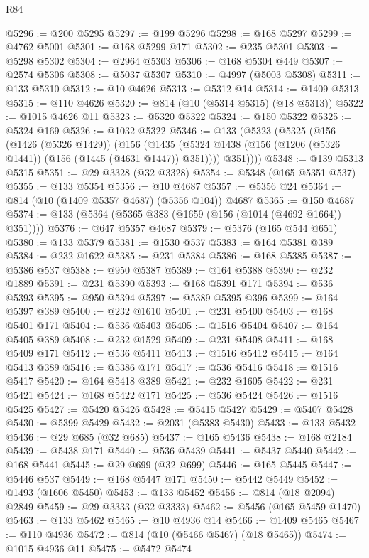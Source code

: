 \begin{lexlean}{R84}
\begin{coremodule}
@5296 := @200 @5295
@5297 := @199 @5296
@5298 := @168 @5297
@5299 := @4762 @5001
@5301 := @168 @5299 @171
@5302 := @235 @5301
@5303 := @5298 @5302
@5304 := @2964 @5303
@5306 := @168 @5304 @449
@5307 := @2574 @5306
@5308 := @5037 @5307
@5310 := @4997 (@5003 @5308)
@5311 := @133 @5310
@5312 := @10 @4626
@5313 := @5312 @14
@5314 := @1409 @5313
@5315 := @110 @4626
@5320 := @814 (@10 (@5314 @5315) (@18 @5313))
@5322 := @1015 @4626 @11
@5323 := @5320 @5322
@5324 := @150 @5322
@5325 := @5324 @169
@5326 := @1032 @5322
@5346 := @133
    (@5323
      (@5325
        (@156
          (@1426 (@5326 @1429))
          (@156
            (@1435 (@5324 @1438 (@156 (@1206 (@5326 @1441)) (@156 (@1445 (@4631 @1447)) @351))))
            @351))))
@5348 := @139 @5313 @5315
@5351 := @29 @3328 (@32 @3328)
@5354 := @5348 (@165 @5351 @537)
@5355 := @133 @5354
@5356 := @10 @4687
@5357 := @5356 @24
@5364 := @814 (@10 (@1409 @5357 @4687) (@5356 @104)) @4687
@5365 := @150 @4687
@5374 := @133 (@5364 (@5365 @383 (@1659 (@156 (@1014 (@4692 @1664)) @351))))
@5376 := @647 @5357 @4687
@5379 := @5376 (@165 @544 @651)
@5380 := @133 @5379
@5381 := @1530 @537
@5383 := @164 @5381 @389
@5384 := @232 @1622
@5385 := @231 @5384
@5386 := @168 @5385
@5387 := @5386 @537
@5388 := @950 @5387
@5389 := @164 @5388
@5390 := @232 @1889
@5391 := @231 @5390
@5393 := @168 @5391 @171
@5394 := @536 @5393
@5395 := @950 @5394
@5397 := @5389 @5395 @396
@5399 := @164 @5397 @389
@5400 := @232 @1610
@5401 := @231 @5400
@5403 := @168 @5401 @171
@5404 := @536 @5403
@5405 := @1516 @5404
@5407 := @164 @5405 @389
@5408 := @232 @1529
@5409 := @231 @5408
@5411 := @168 @5409 @171
@5412 := @536 @5411
@5413 := @1516 @5412
@5415 := @164 @5413 @389
@5416 := @5386 @171
@5417 := @536 @5416
@5418 := @1516 @5417
@5420 := @164 @5418 @389
@5421 := @232 @1605
@5422 := @231 @5421
@5424 := @168 @5422 @171
@5425 := @536 @5424
@5426 := @1516 @5425
@5427 := @5420 @5426
@5428 := @5415 @5427
@5429 := @5407 @5428
@5430 := @5399 @5429
@5432 := @2031 (@5383 @5430)
@5433 := @133 @5432
@5436 := @29 @685 (@32 @685)
@5437 := @165 @5436
@5438 := @168 @2184
@5439 := @5438 @171
@5440 := @536 @5439
@5441 := @5437 @5440
@5442 := @168 @5441
@5445 := @29 @699 (@32 @699)
@5446 := @165 @5445
@5447 := @5446 @537
@5449 := @168 @5447 @171
@5450 := @5442 @5449
@5452 := @1493 (@1606 @5450)
@5453 := @133 @5452
@5456 := @814 (@18 @2094) @2849
@5459 := @29 @3333 (@32 @3333)
@5462 := @5456 (@165 @5459 @1470)
@5463 := @133 @5462
@5465 := @10 @4936 @14
@5466 := @1409 @5465
@5467 := @110 @4936
@5472 := @814 (@10 (@5466 @5467) (@18 @5465))
@5474 := @1015 @4936 @11
@5475 := @5472 @5474

\end{coremodule}
\end{lexlean}
